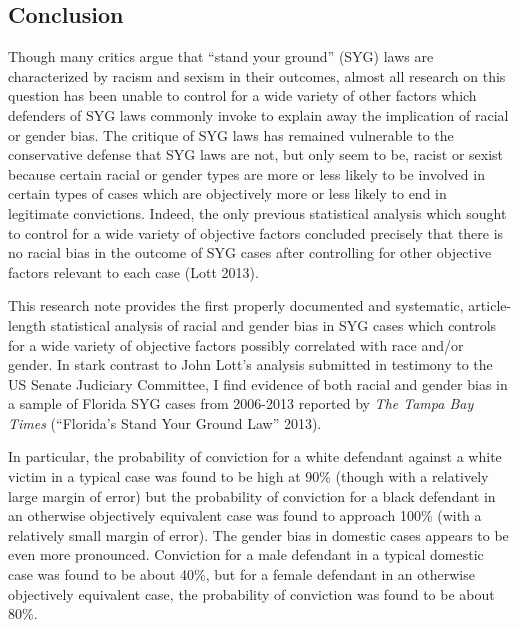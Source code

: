 \documentclass[12pt,article]{article}
\begin{document}
\subsection{Conclusion}\label{conclusion}

Though many critics argue that ``stand your ground'' (SYG) laws are
characterized by racism and sexism in their outcomes, almost all
research on this question has been unable to control for a wide variety
of other factors which defenders of SYG laws commonly invoke to explain
away the implication of racial or gender bias. The critique of SYG laws
has remained vulnerable to the conservative defense that SYG laws are
not, but only seem to be, racist or sexist because certain racial or
gender types are more or less likely to be involved in certain types of
cases which are objectively more or less likely to end in legitimate
convictions. Indeed, the only previous statistical analysis which sought
to control for a wide variety of objective factors concluded precisely
that there is no racial bias in the outcome of SYG cases after
controlling for other objective factors relevant to each case (Lott
2013).

This research note provides the first properly documented and
systematic, article-length statistical analysis of racial and gender
bias in SYG cases which controls for a wide variety of objective factors
possibly correlated with race and/or gender. In stark contrast to John
Lott's analysis submitted in testimony to the US Senate Judiciary
Committee, I find evidence of both racial and gender bias in a sample of
Florida SYG cases from 2006-2013 reported by \emph{The Tampa Bay Times}
(``Florida's Stand Your Ground Law'' 2013).

In particular, the probability of conviction for a white defendant
against a white victim in a typical case was found to be high at 90\%
(though with a relatively large margin of error) but the probability of
conviction for a black defendant in an otherwise objectively equivalent
case was found to approach 100\% (with a relatively small margin of
error). The gender bias in domestic cases appears to be even more
pronounced. Conviction for a male defendant in a typical domestic case
was found to be about 40\%, but for a female defendant in an otherwise
objectively equivalent case, the probability of conviction was found to
be about 80\%.
\end{document}
